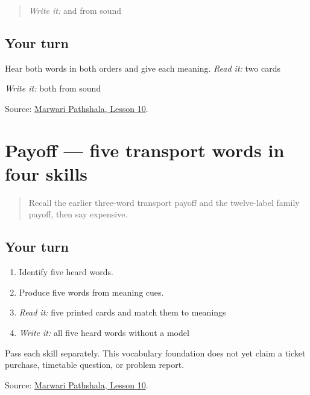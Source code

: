\label{lesson:MW-R17-transport-new-two}



\begin{quote}
\emph{Write it:} \textbf{} and \textbf{} from sound
\end{quote}

\subsection*{Your turn}
Hear both words in both orders and give each meaning. \emph{Read it:} two cards

\emph{Write it:} both from sound

\begin{tcolorbox}[breakable,colback=teal!4,colframe=teal!35!black,title={Before you move on}]
Source: \href{https://www.marwaripathshala.com/marwari-lesson-10-english}{Marwari Pathshala, Lesson 10}.
\end{tcolorbox}
\section[Practice]{Payoff — five transport words in four skills}

\label{lesson:MW-C17-transport-five}



\begin{quote}
Recall the earlier three-word transport payoff and the twelve-label family payoff, then say expensive.
\end{quote}

\subsection*{Your turn}
\begin{enumerate}
\raggedright
  \item Identify five heard words.
  \item Produce five words from meaning cues.
  \item \emph{Read it:} five printed cards and match them to meanings
  \item \emph{Write it:} all five heard words without a model
\end{enumerate}

Pass each skill separately. This vocabulary foundation does not yet claim a ticket purchase, timetable question, or problem report.

\begin{tcolorbox}[breakable,colback=teal!4,colframe=teal!35!black,title={Before you move on}]
Source: \href{https://www.marwaripathshala.com/marwari-lesson-10-english}{Marwari Pathshala, Lesson 10}.
\end{tcolorbox}
